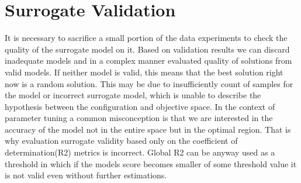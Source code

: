     \section{Surrogate Validation}
    It is necessary to sacrifice a small portion of the data experiments to check the quality of the surrogate model on it. Based on validation results we can discard inadequate models and in a complex manner evaluated quality of solutions from valid models. If neither model is valid, this means that the best solution right now is a random solution. This may be due to insufficiently count of samples for the model or incorrect surrogate model, which is unable to describe the hypothesis between the configuration and objective space. 
    In the context of parameter tuning a common misconception is that we are interested in the accuracy of the model not in the entire space but in the optimal region. That is why evaluation surrogate validity based only on the coefficient of determination(R2) metrics is incorrect. Global R2 can be anyway used as a threshold in which if the models score becomes smaller of some threshold value it is not valid even without further estimations. 


